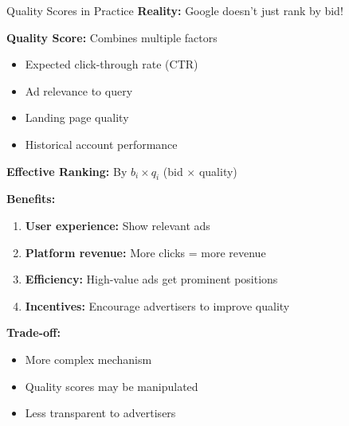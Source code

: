 \documentclass[xcolor={x11names}, aspectratio=169 ]{beamer}
\begin{document}
\begin{frame}{Quality Scores in Practice}
\textbf{Reality:} Google doesn't just rank by bid!

\textbf{Quality Score:} Combines multiple factors
\begin{itemize}
  \item Expected click-through rate (CTR)
  \item Ad relevance to query
  \item Landing page quality
  \item Historical account performance
\end{itemize}

\textbf{Effective Ranking:} By $b_i \times q_i$ (bid $\times$ quality)

\textbf{Benefits:}
\begin{enumerate}
  \item \textbf{User experience:} Show relevant ads
  \item \textbf{Platform revenue:} More clicks = more revenue
  \item \textbf{Efficiency:} High-value ads get prominent positions
  \item \textbf{Incentives:} Encourage advertisers to improve quality
\end{enumerate}

\textbf{Trade-off:}
\begin{itemize}
  \item More complex mechanism
  \item Quality scores may be manipulated
  \item Less transparent to advertisers
\end{itemize}
\end{frame}
\end{document}
